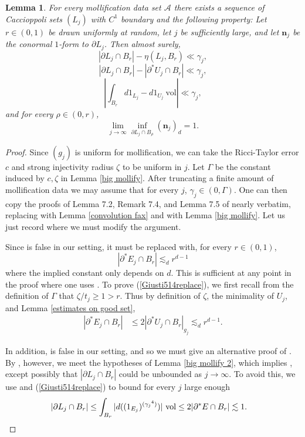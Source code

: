 \documentclass[reqno,12pt,letterpaper]{amsart}
\newcommand{\normal}{\mathbf n}
\newcommand{\vol}{\mathrm{vol}}
\newtheorem{lemma}[theorem]{Lemma}
\theoremstyle{definition}
\numberwithin{equation}{section}
\begin{document}
\begin{lemma}\label{big mollify 3}
For every mollification data set $\mathcal A$ there exists a sequence of Caccioppoli sets $(L_j)$ with $C^1$ boundary and the following property:
Let $r \in (0, 1)$ be drawn uniformly at random, let $j$ be sufficiently large, and let $\normal_j$ be the conormal $1$-form to $\partial L_j$.
Then almost surely,
$$|\partial L_j \cap B_r| - \eta(L_j, B_r) \ll \gamma_j,$$
$$|\partial L_j \cap B_r| - |\partial^* U_j \cap B_r| \ll \gamma_j,$$
$$\left|\int_{B_r} d1_{L_j} - d1_{U_j} ~\vol\right| \ll \gamma_j,$$
and for every $\rho \in (0, r)$,
$$\lim_{j \to \infty} \inf_{\partial L_j \cap B_\rho} (\normal_j)_d = 1.$$
\end{lemma}
\begin{proof}
Since $(g_j)$ is uniform for mollification, we can take the Ricci-Taylor error $c$ and strong injectivity radius $\zeta$ to be uniform in $j$.
Let $\Gamma$ be the constant induced by $c,\zeta$ in Lemma \ref{big mollify}.
After truncating a finite amount of mollification data we may assume that for every $j$, $\gamma_j \in (0, \Gamma)$.
One can then copy the proofs of Lemma 7.2, Remark 7.4, and Lemma 7.5 of \cite{Giusti77} nearly verbatim, replacing \cite[Lemma 7.1]{Giusti77} with Lemma \ref{convolution fax} and \cite[Lemma 7.3]{Giusti77} with Lemma \ref{big mollify}.
Let us just record where we must modify the argument.

Since \cite[(5.14)]{Giusti77} is false in our setting, it must be replaced with, for every $r \in (0, 1)$,
\begin{equation}\label{Giusti514replace}
|\partial^* E_j \cap B_r| \lesssim_d r^{d - 1}
\end{equation}
where the implied constant only depends on $d$.
This is sufficient at any point in the proof where one uses \cite[(5.14)]{Giusti77}.
To prove (\ref{Giusti514replace}), we first recall from the definition of $\Gamma$ that $\zeta/t_j \geq 1 > r$.
Thus by definition of $\zeta$, the minimality of $U_j$, and Lemma \ref{estimates on good set},
\begin{align*}
|\partial^* E_j \cap B_r| &\leq 2|\partial^* U_j \cap B_r|_{g_j} \lesssim_d r^{d - 1}.
\end{align*}

In addition, \cite[(5.5)]{Giusti77} is false in our setting, and so we must give an alternative proof of \cite[(7.24)]{Giusti77}.
By \cite[(7.23)]{Giusti77}, however, we meet the hypotheses of Lemma \ref{big mollify 2}, which implies \cite[(7.24)]{Giusti77}, except possibly that $|\partial L_j \cap B_r|$ could be unbounded as $j \to \infty$.
To avoid this, we use \cite[(7.20-7.21)]{Giusti77} and (\ref{Giusti514replace}) to bound for every $j$ large enough
\begin{align*}
|\partial L_j \cap B_r| &\leq \int_{B_r} |d((1_{E_j})^{({\gamma_j}^4)})| ~\vol \leq 2|\partial^*E \cap B_r| \lesssim 1. \qedhere
\end{align*}
\end{proof}
\end{document}
